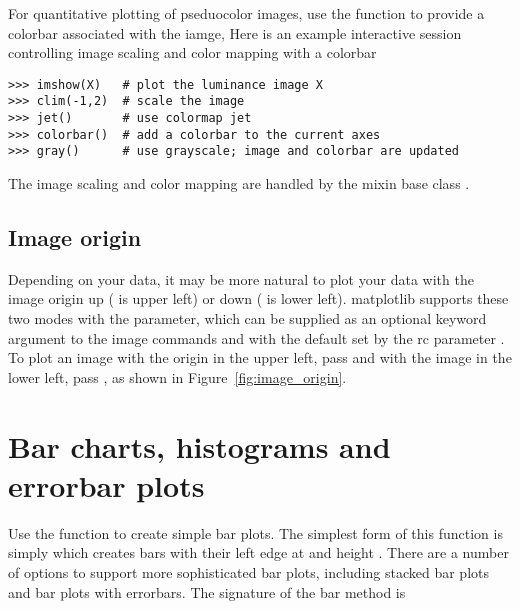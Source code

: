 \documentclass[twoside]{book}
\begin{document}
For quantitative plotting of pseduocolor images, use the
 function to provide a colorbar associated with the
iamge, Here is an example interactive session controlling image
scaling and color mapping with a colorbar

\begin{lstlisting}
>>> imshow(X)   # plot the luminance image X
>>> clim(-1,2)  # scale the image
>>> jet()       # use colormap jet
>>> colorbar()  # add a colorbar to the current axes
>>> gray()      # use grayscale; image and colorbar are updated
\end{lstlisting}

The image scaling and color mapping are handled by the mixin base
class .

\subsection{Image origin}
\label{sec:image_origin}

Depending on your data, it may be more natural to plot your data with
the image origin up ( is upper left) or down
( is lower left).  matplotlib supports these two modes
with the  parameter, which can be supplied as an optional
keyword argument to the image commands  and
 with the default set by the rc parameter
.  To plot an image with the origin in the upper
left, pass  and with the image in the lower left,
pass , as shown in Figure~\ref{fig:image_origin}.








\section{Bar charts, histograms and errorbar plots}
\label{sec:barcharts}

Use the  function to create simple bar plots.  The simplest
form of this function is simply  which creates bars
with their left edge at  and height .  There are a
number of options to support more sophisticated bar plots, including
stacked bar plots and bar plots with errorbars.  The signature of the
bar method is
\end{document}
